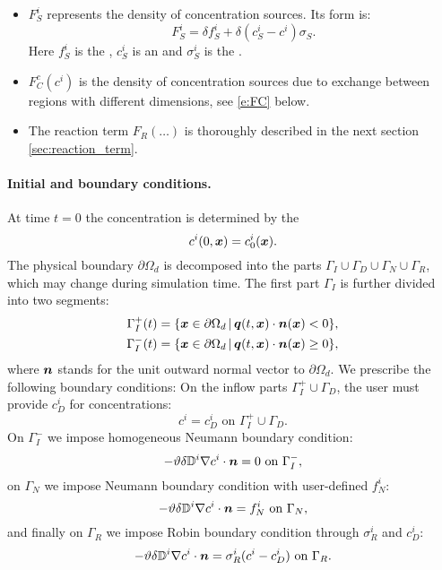 \begin{itemize}
\item $F_S^i$  represents the density of concentration sources.
Its form is:
\begin{equation}
 F_S^i = \delta f^i_S + \delta(c_S^i-c^i)\sigma_S. \label{eqn:transport_sources}
\end{equation}
Here $f_S^i$  is the , $c_S^i$  is an  and $\sigma_S^i$  is the .

\item $F^c_C(c^i)$  is the density of concentration sources due to exchange between regions with different dimensions, see \eqref{e:FC} below.

\item The reaction term $F_R(\dots)$  is thoroughly described in the next section \ref{sec:reaction_term}.
\end{itemize}



\paragraph{Initial and boundary conditions.}
At time $t=0$ the concentration is determined by the 
$$ c^i(0,\mathbf{\boldsymbol{x}}) = c^i_0(\mathbf{\boldsymbol{x}}). $$
The physical boundary $\partial\Omega_d$ is decomposed into the parts $\Gamma_I\cup\Gamma_D\cup\Gamma_N\cup\Gamma_R$, which may change during simulation time.
The first part $\Gamma_I$ is further divided into two segments:
\begin{align*}
\Gamma_I^+(t) &= \{\mathbf{\boldsymbol{x}}\in \partial\Omega_d\,|\, \mathbf{\boldsymbol{q}}(t,\mathbf{\boldsymbol{x}})\cdot\mathbf{\boldsymbol{n}}(\mathbf{\boldsymbol{x}})<0\},\\
\Gamma_I^-(t) &= \{\mathbf{\boldsymbol{x}}\in \partial\Omega_d\,|\, \mathbf{\boldsymbol{q}}(t,\mathbf{\boldsymbol{x}})\cdot\mathbf{\boldsymbol{n}}(\mathbf{\boldsymbol{x}})\ge 0\},
\end{align*}
where $\mathbf{\boldsymbol{n}}$ stands for the unit outward normal vector to $\partial\Omega_d$.
We prescribe the following boundary conditions:
On the inflow parts $\Gamma_I^+\cup\Gamma_D$, the user must provide  $c_D^i$ for concentrations:
$$ c^i = c^i_D \mbox{ on }\Gamma_I^+\cup\Gamma_D. $$
On $\Gamma_I^-$ we impose homogeneous Neumann boundary condition:
$$ -\vartheta\delta{{\mathbb{D}}}^i\nabla c^i\cdot\mathbf{\boldsymbol{n}} = 0 \mbox{ on }\Gamma_I^-, $$
on $\Gamma_N$ we impose Neumann boundary condition with user-defined  $f^i_N$:
$$ -\vartheta\delta{{\mathbb{D}}}^i\nabla c^i\cdot\mathbf{\boldsymbol{n}} = f^i_N \mbox{ on }\Gamma_N, $$
and finally on $\Gamma_R$ we impose Robin boundary condition through  $\sigma^i_R$ and  $c^i_D$:
$$ -\vartheta\delta{{\mathbb{D}}}^i\nabla c^i\cdot\mathbf{\boldsymbol{n}} = \sigma^i_R(c^i-c^i_D) \mbox{ on }\Gamma_R. $$






